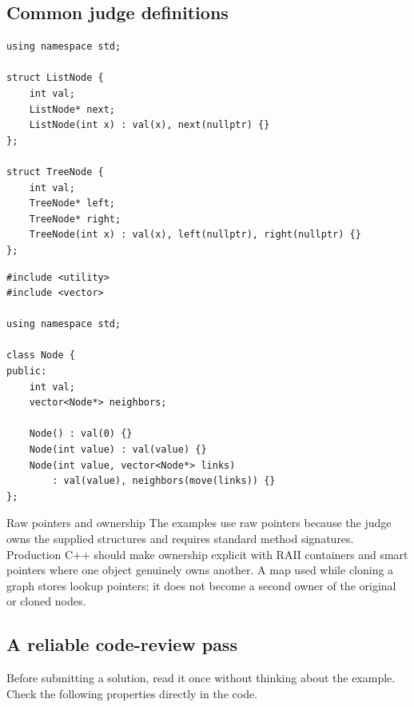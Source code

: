 \subsection{Common judge definitions}

\begin{lstlisting}[style=compactcode,caption={Typical linked-list and binary-tree definitions}]
using namespace std;

struct ListNode {
    int val;
    ListNode* next;
    ListNode(int x) : val(x), next(nullptr) {}
};

struct TreeNode {
    int val;
    TreeNode* left;
    TreeNode* right;
    TreeNode(int x) : val(x), left(nullptr), right(nullptr) {}
};
\end{lstlisting}

\begin{lstlisting}[style=compactcode,caption={Typical graph-node definition}]
#include <utility>
#include <vector>

using namespace std;

class Node {
public:
    int val;
    vector<Node*> neighbors;

    Node() : val(0) {}
    Node(int value) : val(value) {}
    Node(int value, vector<Node*> links)
        : val(value), neighbors(move(links)) {}
};
\end{lstlisting}

\begin{conceptbox}{Raw pointers and ownership}
The examples use raw pointers because the judge owns the supplied structures
and requires standard method signatures. Production C++ should make ownership
explicit with RAII containers and smart pointers where one object genuinely
owns another. A map used while cloning a graph stores lookup pointers; it does
not become a second owner of the original or cloned nodes.
\end{conceptbox}

\subsection{A reliable code-review pass}

Before submitting a solution, read it once without thinking about the example.
Check the following properties directly in the code.

